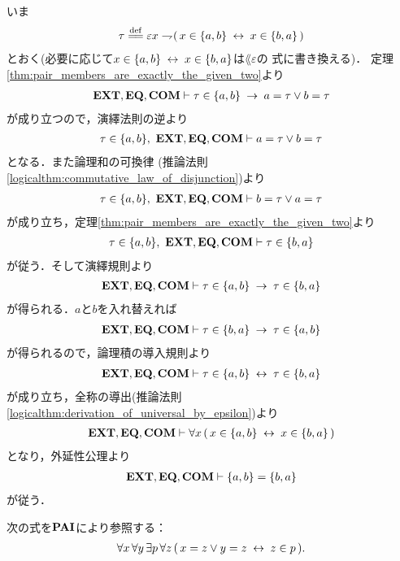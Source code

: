 	\begin{sketch}
		いま
		\begin{align}
			\tau \defeq \varepsilon x \negation (\, x \in \{a,b\} \lrarrow x \in \{b,a\}\, )
		\end{align}
		とおく(必要に応じて$x \in \{a,b\} \hspace{0.25em}\leftrightarrow\hspace{0.25em} x \in \{b,a\}$は$\lang{\varepsilon}$の
		式に書き換える)．
		定理\ref{thm:pair_members_are_exactly_the_given_two}より
		\begin{align}
			\mbox{{\bf EXT}},\mbox{{\bf EQ}},\mbox{\bf COM} \vdash
			\tau \in \{a,b\} \hspace{0.25em}\rightarrow\hspace{0.25em} a = \tau \vee b = \tau
		\end{align}
		が成り立つので，演繹法則の逆より
		\begin{align}
			\tau \in \{a,b\},\ \mbox{{\bf EXT}},\mbox{{\bf EQ}},\mbox{\bf COM} \vdash a = \tau \vee b = \tau
		\end{align}
		となる．また論理和の可換律
		(推論法則\ref{logicalthm:commutative_law_of_disjunction})より
		\begin{align}
			\tau \in \{a,b\},\ \mbox{{\bf EXT}},\mbox{{\bf EQ}},\mbox{\bf COM} \vdash b = \tau \vee a = \tau
		\end{align}
		が成り立ち，定理\ref{thm:pair_members_are_exactly_the_given_two}より
		\begin{align}
			\tau \in \{a,b\},\ \mbox{{\bf EXT}},\mbox{{\bf EQ}},\mbox{\bf COM} \vdash \tau \in \{b,a\}
		\end{align}
		が従う．そして演繹規則より
		\begin{align}
			\mbox{{\bf EXT}},\mbox{{\bf EQ}},\mbox{\bf COM} \vdash \tau \in \{a,b\} \hspace{0.25em}\rightarrow\hspace{0.25em} \tau \in \{b,a\}
		\end{align}
		が得られる．$a$と$b$を入れ替えれば
		\begin{align}
			\mbox{{\bf EXT}},\mbox{{\bf EQ}},\mbox{\bf COM} \vdash \tau \in \{b,a\} \hspace{0.25em}\rightarrow\hspace{0.25em} \tau \in \{a,b\}
		\end{align}
		が得られるので，論理積の導入規則より
		\begin{align}
			\mbox{{\bf EXT}},\mbox{{\bf EQ}},\mbox{\bf COM} \vdash \tau \in \{a,b\} \hspace{0.25em}\leftrightarrow\hspace{0.25em} \tau \in \{b,a\}
		\end{align}
		が成り立ち，全称の導出(推論法則\ref{logicalthm:derivation_of_universal_by_epsilon})より
		\begin{align}
			\mbox{{\bf EXT}},\mbox{{\bf EQ}},\mbox{\bf COM} \vdash \forall x\, (\, x \in \{a,b\} \hspace{0.25em}\leftrightarrow\hspace{0.25em} x \in \{b,a\}\, )
		\end{align}
		となり，外延性公理より
		\begin{align}
			\mbox{{\bf EXT}},\mbox{{\bf EQ}},\mbox{\bf COM} \vdash \{a,b\} = \{b,a\}
		\end{align}
		が従う．
		\QED
	\end{sketch}
		
	\begin{screen}
		\begin{axm}[対の公理] 次の式を$\mbox{{\bf PAI}}$により参照する：
			\begin{align}
				\forall x\, \forall y\, \exists p\, \forall z\, 
				(\, x = z \vee y = z \hspace{0.25em}\leftrightarrow\hspace{0.25em} z \in p\, ).
			\end{align}
		\end{axm}
	\end{screen}
	
